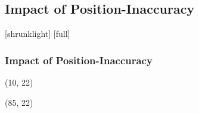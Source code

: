 \documentclass[14pt,compress,aspectratio=169]{beamer} %
\begin{document}
\subsection{Impact of Position-Inaccuracy} 
[shrunklight]
[full]
\begin{frame}[t]
\frametitle{Impact of Position-Inaccuracy} 
	\begin{textblock}{50}(10, 22)
	\centering
	\begin{overprint}
	\end{overprint}
	\end{textblock}
	\begin{textblock}{50}(85, 22)
	\centering
	\begin{overprint}

\end{overprint}
\end{textblock}
\end{frame}
\end{document}
